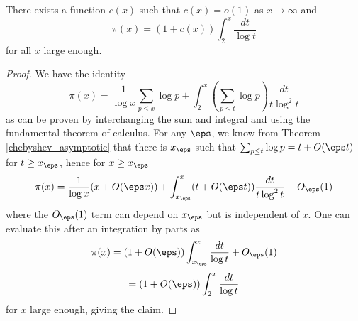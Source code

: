 \begin{theorem}[pi-asymp]
\label{pi_asymp}
\leanok
There exists a function $c(x)$ such that $c(x) = o(1)$ as $x \to \infty$ and
  $$ \pi(x) = (1 + c(x)) \int_2^x \frac{dt}{\log t}$$
  for all $x$ large enough.
\end{theorem}
\begin{proof}
\leanok
We have the identity
  $$ \pi(x) = \frac{1}{\log x} \sum_{p \leq x} \log p
  + \int_2^x (\sum_{p \leq t} \log p) \frac{dt}{t \log^2 t}$$
  as can be proven by interchanging the sum and integral and using the fundamental theorem of
  calculus.  For any $\eps$, we know from Theorem \ref{chebyshev_asymptotic} that there is $x_\eps$
  such that $\sum_{p \leq t} \log p = t + O(\eps t)$ for $t \geq x_\eps$, hence for $x \geq x_\eps$
  $$ \pi(x) = \frac{1}{\log x} (x + O(\eps x))
  + \int_{x_\eps}^x (t + O(\eps t)) \frac{dt}{t \log^2 t} + O_\eps(1)$$
  where the $O_\eps(1)$ term can depend on $x_\eps$ but is independent of $x$.  One can evaluate
  this after an integration by parts as
  $$ \pi(x) = (1+O(\eps)) \int_{x_\eps}^x \frac{dt}{\log t} + O_\eps(1)$$
  $$  = (1+O(\eps)) \int_{2}^x \frac{dt}{\log t} $$
  for $x$ large enough, giving the claim.
\end{proof}
